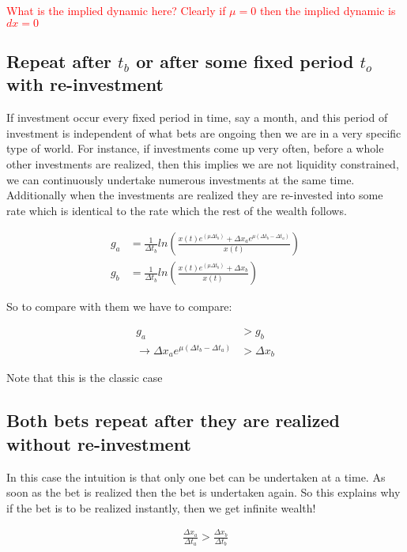 \documentclass{article}
\begin{document}
\textcolor{red}{What is the implied dynamic here? Clearly if $\mu=0$ then the implied dynamic is $dx = 0$}

\subsection{Repeat after $t_b$ or after some fixed period $t_o$ with re-investment }

If investment occur every fixed period in time, say a month, and this period of investment is independent of what bets are ongoing then we are in a very specific type of world. For instance, if investments come up very often, before a whole other investments are realized, then this implies we are not liquidity constrained, we can continuously undertake numerous investments at the same time. Additionally when the investments are realized they are re-invested into some rate which is identical to the rate which the rest of the wealth follows. 

\begin{align*}
g_a&= \frac{1}{\Delta t_b} ln 
\left( 
\frac{x(t)e^{(\mu \Delta t_b)}+\Delta x_a e^{\mu (\Delta t_b - \Delta t_a)}}{x(t)}
\right) \\
g_b&=\frac{1}{\Delta t_b} ln 
\left( 
\frac{x(t)e^{(\mu \Delta t_b)}+\Delta x_b }{x(t)}
\right) 
\end{align*}

So to compare with them we have to compare: 

\begin{align*}
g_a&>g_b \\
\rightarrow \Delta x_a e^{\mu (\Delta t_b-\Delta t_a)}&>\Delta x_b
\end{align*}

Note that this is the classic case

\subsection{Both bets repeat after they are realized without re-investment}

In this case the intuition is that only one bet can be undertaken at a time. As soon as the bet is realized then the bet is undertaken again. So this explains why if the bet is to be realized instantly, then we get infinite wealth! 

\begin{align*}
\frac{\Delta x_a}{\Delta t_a} > \frac{\Delta x_b}{\Delta t_b}
\end{align*}
\end{document}
